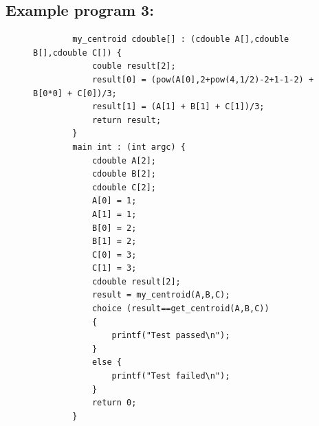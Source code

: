 \documentclass[12pt]{article}
\begin{document}
\subsection{Example program 3:}
\begin{figure}[H]
    \label{ex_program_3}
    \centering
    \begin{BVerbatim}
        my_centroid cdouble[] : (cdouble A[],cdouble B[],cdouble C[]) {
            couble result[2];
            result[0] = (pow(A[0],2+pow(4,1/2)-2+1-1-2) + B[0*0] + C[0])/3;
            result[1] = (A[1] + B[1] + C[1])/3;
            return result;
        }
        main int : (int argc) {
            cdouble A[2];
            cdouble B[2];
            cdouble C[2];
            A[0] = 1;
            A[1] = 1;
            B[0] = 2;
            B[1] = 2;
            C[0] = 3;
            C[1] = 3;
            cdouble result[2];
            result = my_centroid(A,B,C);
            choice (result==get_centroid(A,B,C))
            {
                printf("Test passed\n");
            }
            else {
                printf("Test failed\n");
            }
            return 0;
        }
    \end{BVerbatim}
\end{figure}
\end{document}
